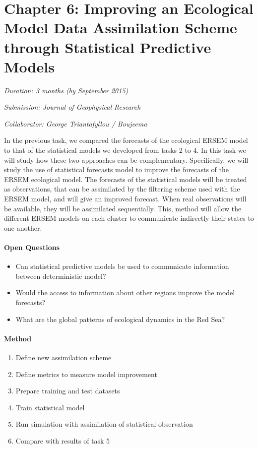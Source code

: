 \section{Chapter 6: Improving an Ecological Model Data Assimilation Scheme through Statistical Predictive Models}

\noindent
\emph{Duration: 3 months (by September 2015)}

\noindent
\emph{Submission: Journal of Geophysical Research}

\noindent
\emph{Collaborator: George Triantafyllou / Boujeema}

In the previous task, we compared the forecasts of the ecological ERSEM model to that of the statistical models we developed from tasks 2 to 4. In this task we will study how these two approaches can be complementary. Specifically, we will study the use of statistical forecasts model to improve the forecasts of the ERSEM ecological model. The forecasts of the statistical models will be treated as observations, that can be assimilated by the filtering scheme used with the ERSEM model, and will give an improved forecast. When real observations will be available, they will be assimilated sequentially. This, method will allow the different ERSEM models on each cluster to communicate indirectly their states to one another. 

\paragraph{Open Questions}

\begin{itemize}
\item Can statistical predictive models be used to communicate information between deterministic model?
\item Would the access to information about other regions improve the model forecasts?
\item What are the global patterns of ecological dynamics in the Red Sea?
\end{itemize}

\paragraph{Method}

\begin{enumerate}
\item Define new assimilation scheme
\item Define metrics to measure model improvement
\item Prepare training and test datasets
\item Train statistical model
\item Run simulation with assimilation of statistical observation
\item Compare with results of task 5
\end{enumerate}

